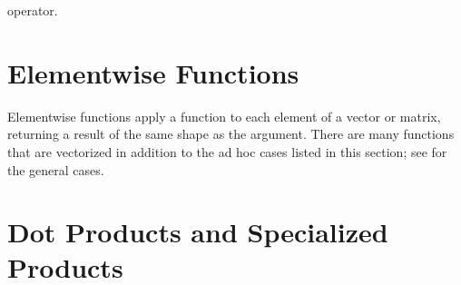 \begin{description}
\begin{description}
\begin{description}
\begin{description}
\begin{description}
\begin{description}
\begin{description}
\begin{description}
\begin{description}
\begin{description}
\begin{description}
\begin{description}
\begin{description}
\begin{description}
\begin{description}
\begin{description}
\begin{description}
\begin{description}
\begin{description}
\begin{description}
\begin{description}
\begin{description}
\begin{description}
\begin{description}
\begin{description}
\begin{description}
\begin{description}
\begin{description}
\begin{description}
\begin{description}
\begin{description}
\begin{description}
\begin{description}
\begin{description}
\begin{description}
\begin{description}
\begin{description}
\begin{description}
\begin{description}
\begin{description}
\begin{description}
\begin{description}
operator.

\begin{description} %



\section{Elementwise Functions}

Elementwise functions apply a function to each element of a vector or matrix, returning a result of the same shape as the argument.  There are many functions that are vectorized in addition to the ad hoc cases listed in this section;  see  for the general cases.



\section{Dot Products and Specialized Products}


\end{description}
\end{description}
\end{description}
\end{description}
\end{description}
\end{description}
\end{description}
\end{description}
\end{description}
\end{description}
\end{description}
\end{description}
\end{description}
\end{description}
\end{description}
\end{description}
\end{description}
\end{description}
\end{description}
\end{description}
\end{description}
\end{description}
\end{description}
\end{description}
\end{description}
\end{description}
\end{description}
\end{description}
\end{description}
\end{description}
\end{description}
\end{description}
\end{description}
\end{description}
\end{description}
\end{description}
\end{description}
\end{description}
\end{description}
\end{description}
\end{description}
\end{description}
\end{description}
